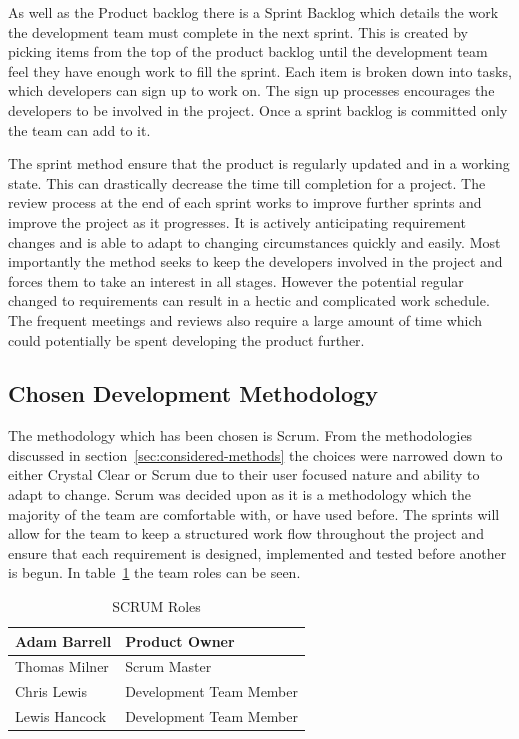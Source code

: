 \documentclass[11pt,a4paper]{article}
\begin{document}
As well as the Product backlog there is a Sprint Backlog which details the work the development team must complete in the next sprint. This is created by picking items from the top of the product backlog until the development team feel they have enough work to fill the sprint. Each item is broken down into tasks, which developers can sign up to work on. The sign up processes encourages the developers to be involved in the project. Once a sprint backlog is committed only the team can add to it.

The sprint method ensure that the product is regularly updated and in a working state. This can drastically decrease the time till completion for a project. The review process at the end of each sprint works to improve further sprints and improve the project as it progresses. It is actively anticipating requirement changes and is able to adapt to changing circumstances quickly and easily. Most importantly the method seeks to keep the developers involved in the project and forces them to take an interest in all stages. However the potential regular changed to requirements can result in a hectic and complicated work schedule. The frequent meetings and reviews also require a large amount of time which could potentially be spent developing the product further. 

\subsection{Chosen Development Methodology}
\label{sec:chosen-method}

The methodology which has been chosen is Scrum. From the methodologies discussed in section~\ref{sec:considered-methods} the choices were narrowed down to either Crystal Clear or Scrum due to their user focused nature and ability to adapt to change. Scrum was decided upon as it is a methodology which the majority of the team are comfortable with, or have used before. The sprints will allow for the team to keep a structured work flow throughout the project and ensure that each requirement is designed, implemented and tested before another is begun. In table~\ref{tab:scrumRoles} the team roles can be seen.

\begin{table}[H]
\centering
\begin{tabular}{|l|l|}
\hline
Adam Barrell & Product Owner \\ \hline
Thomas Milner & Scrum Master \\ \hline
Chris Lewis & Development Team Member \\ \hline
Lewis Hancock & Development Team Member \\ \hline
\end{tabular}
\caption{SCRUM Roles}
\label{tab:scrumRoles}
\end{table}
\end{document}

